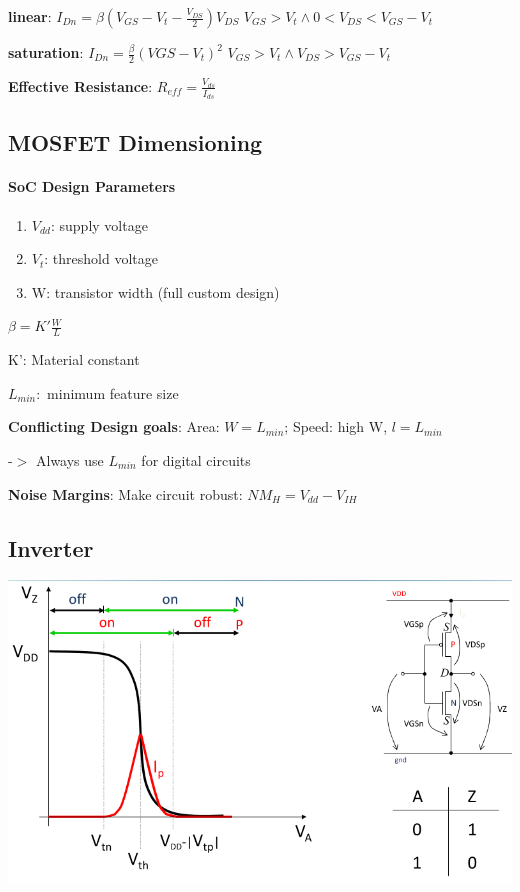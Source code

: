 \documentclass[english]{latex4ei/latex4ei_sheet}
\begin{document}
\textbf{linear}: \qquad $I_{Dn} = \beta (V_{GS} - V_t - \frac{V_{DS}}{2})V_{DS} $ \qquad $V_{GS} > V_t \wedge  0 < V_{DS} < V_{GS} - V_t$

\textbf{saturation}: \qquad $I_{Dn} = \frac{\beta}{2} (V{GS} - V_t)^2$ \qquad $V_{GS} > V_t \wedge  V_{DS} > V_{GS} - V_t$

\textbf{Effective Resistance}: $R_{eff} = \frac{V_{ds}}{I_{ds}}$

\subsection{MOSFET Dimensioning}
\paragraph{SoC Design Parameters}
\begin{enumerate}
	\item $V_{dd}$: supply voltage
	\item $V_t$: threshold voltage
	\item W: transistor width (full custom design)
\end{enumerate}

$\beta = K' \frac{W}{L}$

K': Material constant

$L_{min}:$ minimum feature size

\textbf{Conflicting Design goals}: Area: $W = L_{min}$; Speed: high W, $l = L_{min}$

-$>$ Always use $L_{min}$ for digital circuits

\textbf{Noise Margins}: Make circuit robust: $NM_H = V_{dd} - V_{IH}$

\subsection{Inverter}

\begin{center}
  \centering
  \includegraphics[width=0.8\linewidth]{assets/StaticInverterVoltageCurve.png}
  \label{fig:staticinvertervoltagecurve}
\end{center}
\end{document}
